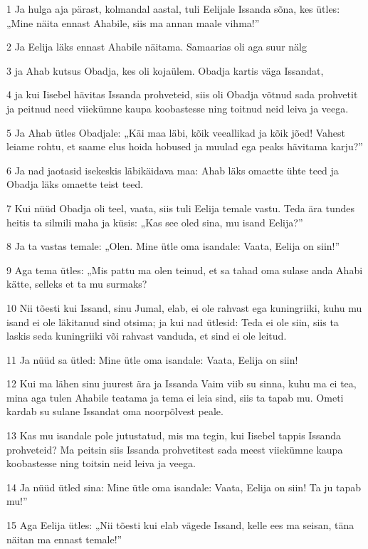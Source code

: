 \par 1 Ja hulga aja pärast, kolmandal aastal, tuli Eelijale Issanda sõna, kes ütles: „Mine näita ennast Ahabile, siis ma annan maale vihma!”
\par 2 Ja Eelija läks ennast Ahabile näitama. Samaarias oli aga suur nälg
\par 3 ja Ahab kutsus Obadja, kes oli kojaülem. Obadja kartis väga Issandat,
\par 4 ja kui Iisebel hävitas Issanda prohveteid, siis oli Obadja võtnud sada prohvetit ja peitnud need viiekümne kaupa koobastesse ning toitnud neid leiva ja veega.
\par 5 Ja Ahab ütles Obadjale: „Käi maa läbi, kõik veeallikad ja kõik jõed! Vahest leiame rohtu, et saame elus hoida hobused ja muulad ega peaks hävitama karju?”
\par 6 Ja nad jaotasid isekeskis läbikäidava maa: Ahab läks omaette ühte teed ja Obadja läks omaette teist teed.
\par 7 Kui nüüd Obadja oli teel, vaata, siis tuli Eelija temale vastu. Teda ära tundes heitis ta silmili maha ja küsis: „Kas see oled sina, mu isand Eelija?”
\par 8 Ja ta vastas temale: „Olen. Mine ütle oma isandale: Vaata, Eelija on siin!”
\par 9 Aga tema ütles: „Mis pattu ma olen teinud, et sa tahad oma sulase anda Ahabi kätte, selleks et ta mu surmaks?
\par 10 Nii tõesti kui Issand, sinu Jumal, elab, ei ole rahvast ega kuningriiki, kuhu mu isand ei ole läkitanud sind otsima; ja kui nad ütlesid: Teda ei ole siin, siis ta laskis seda kuningriiki või rahvast vanduda, et sind ei ole leitud.
\par 11 Ja nüüd sa ütled: Mine ütle oma isandale: Vaata, Eelija on siin!
\par 12 Kui ma lähen sinu juurest ära ja Issanda Vaim viib su sinna, kuhu ma ei tea, mina aga tulen Ahabile teatama ja tema ei leia sind, siis ta tapab mu. Ometi kardab su sulane Issandat oma noorpõlvest peale.
\par 13 Kas mu isandale pole jutustatud, mis ma tegin, kui Iisebel tappis Issanda prohveteid? Ma peitsin siis Issanda prohvetitest sada meest viiekümne kaupa koobastesse ning toitsin neid leiva ja veega.
\par 14 Ja nüüd ütled sina: Mine ütle oma isandale: Vaata, Eelija on siin! Ta ju tapab mu!”
\par 15 Aga Eelija ütles: „Nii tõesti kui elab vägede Issand, kelle ees ma seisan, täna näitan ma ennast temale!”
